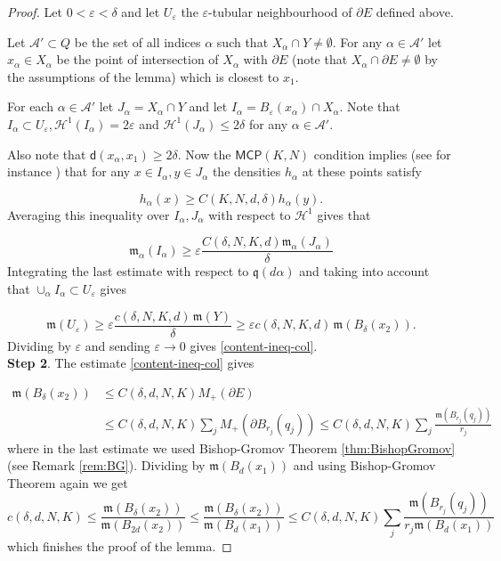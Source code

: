 \documentclass[a4paper]{amsart}
\newcounter{assu}
\theoremstyle{plain}
\theoremstyle{definition}
\numberwithin{equation}{section}
\newcommand{\MCP}{\mathsf{MCP}}
\newcommand{\mm}{\mathfrak m}
\newcommand{\sfd}{\mathsf d}
\newcommand{\eps}{\varepsilon}
\begin{document}
{\begin{proof}
Let $0<\eps<\delta$ and let $U_\eps$ the $\eps$-tubular neighbourhood of $\partial E$ defined above.


Let $\mathcal A'\subset Q$ be the set of all indices $\alpha$ such that $X_\alpha \cap Y\ne\emptyset$.
For any $\alpha\in\mathcal A'$ let $x_\alpha\in X_\alpha$ be the  point of intersection of $X_\alpha$ with $\partial E$ (note that $X_\alpha\cap\partial E\ne\emptyset$ by the assumptions of the lemma) which is closest to $x_1$.

For each $\alpha\in\mathcal A'$ let $J_\alpha=X_\alpha\cap Y$ and let $I_\alpha=B_\eps(x_\alpha)\cap X_\alpha$. Note that $I_\alpha\subset U_\eps, \mathcal H^1(I_\alpha)=2\eps$ and $\mathcal H^1(J_\alpha)\le 2\delta$ for any $\alpha\in\mathcal A'$.


Also note that $\sfd(x_\alpha,x_1)\ge 2\delta$. Now  the $\MCP(K,N)$ condition implies (see for instance \cite[(2.10)]{CaMo})  that for any $x\in I_\alpha, y\in J_\alpha$  the densities $h_\alpha$ at these points satisfy

\[
h_\alpha(x)\ge C(K,N,d,\delta) h_\alpha(y).
\]
Averaging this inequality over $I_\alpha, J_\alpha$ with respect to $\mathcal H^1$ gives that

\[
\mm_\alpha(I_\alpha)\ge \eps \frac{C(\delta,N,K,d) \mm_\alpha(J_\alpha)}{\delta}
\]
Integrating the last estimate with respect to $\mathfrak q(d\alpha)$ and taking into account that  $\cup_{\alpha} I_\alpha \subset U_\eps$ gives



\[
\mm(U_\eps)\ge \eps \frac{c(\delta, N,K,d) \,  \mm(Y)}{\delta}\ge \eps c(\delta, N,K,d) \, {\mm(B_\delta(x_2))}.
\]
Dividing by $\eps$ and sending $\eps\to 0$ gives \eqref{content-ineq-col}.
\\

\textbf{Step 2}. The estimate \eqref{content-ineq-col} gives

\begin{align*}
 \mm( B_\delta(x_2)) &\le C(\delta,d,N,K) M_{+}(\partial E) \\
& \le C(\delta,d,N,K) \sum_j M_{+} (\partial B_{r_j}(q_j))\le C(\delta,d,N,K) \sum_j \frac{\mm( B_{r_j}(q_j))}{r_j}
\end{align*}
where in the last estimate we used Bishop-Gromov Theorem \ref{thm:BishopGromov} (see Remark \ref{rem:BG}). 
Dividing by $\mm(B_d(x_1))$ and using Bishop-Gromov Theorem again we get 
\[
c(\delta,d,N,K)\le \frac{ \mm( B_\delta(x_2))}{\mm(B_{2d}(x_2))}\le \frac{ \mm( B_\delta(x_2))}{\mm(B_{d}(x_1))}\le  C(\delta,d,N,K) \sum_j \frac{\mm( B_{r_j}(q_j))}{r_j \mm(B_{d}(x_1))}
\]
which finishes the proof of the lemma.



\end{proof}}
\end{document}
